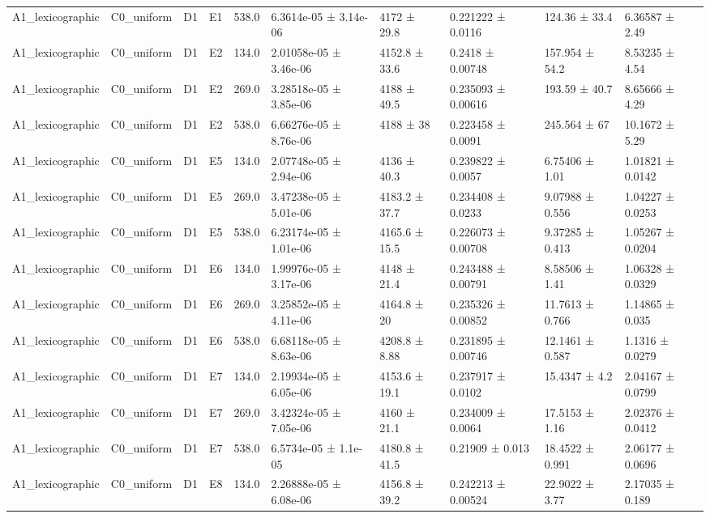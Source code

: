 \begin{table}
\begin{tabular}{llllllllll}
A1\_lexicographic & C0\_uniform & D1 & E1 & 538.0 & 6.3614e-05 ± 3.14e-06 & 4172 ± 29.8 & 0.221222 ± 0.0116 & 124.36 ± 33.4 & 6.36587 ± 2.49 \\
A1\_lexicographic & C0\_uniform & D1 & E2 & 134.0 & 2.01058e-05 ± 3.46e-06 & 4152.8 ± 33.6 & 0.2418 ± 0.00748 & 157.954 ± 54.2 & 8.53235 ± 4.54 \\
A1\_lexicographic & C0\_uniform & D1 & E2 & 269.0 & 3.28518e-05 ± 3.85e-06 & 4188 ± 49.5 & 0.235093 ± 0.00616 & 193.59 ± 40.7 & 8.65666 ± 4.29 \\
A1\_lexicographic & C0\_uniform & D1 & E2 & 538.0 & 6.66276e-05 ± 8.76e-06 & 4188 ± 38 & 0.223458 ± 0.0091 & 245.564 ± 67 & 10.1672 ± 5.29 \\
A1\_lexicographic & C0\_uniform & D1 & E5 & 134.0 & 2.07748e-05 ± 2.94e-06 & 4136 ± 40.3 & 0.239822 ± 0.0057 & 6.75406 ± 1.01 & 1.01821 ± 0.0142 \\
A1\_lexicographic & C0\_uniform & D1 & E5 & 269.0 & 3.47238e-05 ± 5.01e-06 & 4183.2 ± 37.7 & 0.234408 ± 0.0233 & 9.07988 ± 0.556 & 1.04227 ± 0.0253 \\
A1\_lexicographic & C0\_uniform & D1 & E5 & 538.0 & 6.23174e-05 ± 1.01e-06 & 4165.6 ± 15.5 & 0.226073 ± 0.00708 & 9.37285 ± 0.413 & 1.05267 ± 0.0204 \\
A1\_lexicographic & C0\_uniform & D1 & E6 & 134.0 & 1.99976e-05 ± 3.17e-06 & 4148 ± 21.4 & 0.243488 ± 0.00791 & 8.58506 ± 1.41 & 1.06328 ± 0.0329 \\
A1\_lexicographic & C0\_uniform & D1 & E6 & 269.0 & 3.25852e-05 ± 4.11e-06 & 4164.8 ± 20 & 0.235326 ± 0.00852 & 11.7613 ± 0.766 & 1.14865 ± 0.035 \\
A1\_lexicographic & C0\_uniform & D1 & E6 & 538.0 & 6.68118e-05 ± 8.63e-06 & 4208.8 ± 8.88 & 0.231895 ± 0.00746 & 12.1461 ± 0.587 & 1.1316 ± 0.0279 \\
A1\_lexicographic & C0\_uniform & D1 & E7 & 134.0 & 2.19934e-05 ± 6.05e-06 & 4153.6 ± 19.1 & 0.237917 ± 0.0102 & 15.4347 ± 4.2 & 2.04167 ± 0.0799 \\
A1\_lexicographic & C0\_uniform & D1 & E7 & 269.0 & 3.42324e-05 ± 7.05e-06 & 4160 ± 21.1 & 0.234009 ± 0.0064 & 17.5153 ± 1.16 & 2.02376 ± 0.0412 \\
A1\_lexicographic & C0\_uniform & D1 & E7 & 538.0 & 6.5734e-05 ± 1.1e-05 & 4180.8 ± 41.5 & 0.21909 ± 0.013 & 18.4522 ± 0.991 & 2.06177 ± 0.0696 \\
A1\_lexicographic & C0\_uniform & D1 & E8 & 134.0 & 2.26888e-05 ± 6.08e-06 & 4156.8 ± 39.2 & 0.242213 ± 0.00524 & 22.9022 ± 3.77 & 2.17035 ± 0.189 \\

\end{tabular}
\end{table}
